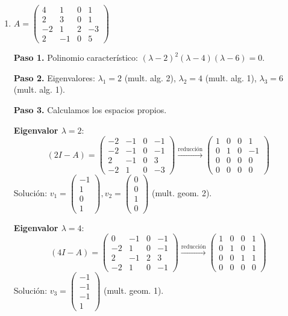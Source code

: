 \begin{example}
\begin{enumerate}[$a)$]
\item $A=\left(\begin{matrix}
4 & 1 & 0 & 1 \\
2 & 3 & 0 & 1 \\
-2 & 1 & 2 & -3 \\
2 & -1 & 0 & 5
\end{matrix}\right)$
\begin{myproof}
\textbf{Paso 1.} Polinomio característico: $(\lambda-2)^2(\lambda-4)(\lambda-6)=0$.

\textbf{Paso 2.} Eigenvalores: $\lambda_1=2$ (mult. alg. 2), $\lambda_2=4$ (mult. alg. 1), $\lambda_3=6$ (mult. alg. 1).

\textbf{Paso 3.} Calculamos los espacios propios.

\textbf{Eigenvalor $\lambda=2$}:
\[
(2I - A) = \begin{pmatrix}
-2 & -1 & 0 & -1 \\
-2 & -1 & 0 & -1 \\
2 & -1 & 0 & 3 \\
-2 & 1 & 0 & -3
\end{pmatrix} \xrightarrow{\text{reducción}} \begin{pmatrix}
1 & 0 & 0 & 1 \\
0 & 1 & 0 & -1 \\
0 & 0 & 0 & 0 \\
0 & 0 & 0 & 0
\end{pmatrix}
\]
Solución: $v_1 = \begin{pmatrix} -1 \\ 1 \\ 0 \\ 1 \end{pmatrix}, v_2 = \begin{pmatrix} 0 \\ 0 \\ 1 \\ 0 \end{pmatrix}$ (mult. geom. 2).

\textbf{Eigenvalor $\lambda=4$}:
\[
(4I - A) = \begin{pmatrix}
0 & -1 & 0 & -1 \\
-2 & 1 & 0 & -1 \\
2 & -1 & 2 & 3 \\
-2 & 1 & 0 & -1
\end{pmatrix} \xrightarrow{\text{reducción}} \begin{pmatrix}
1 & 0 & 0 & 1 \\
0 & 1 & 0 & 1 \\
0 & 0 & 1 & 1 \\
0 & 0 & 0 & 0
\end{pmatrix}
\]
Solución: $v_3 = \begin{pmatrix} -1 \\ -1 \\ -1 \\ 1 \end{pmatrix}$ (mult. geom. 1).


\end{myproof}
\end{enumerate}
\end{example}
